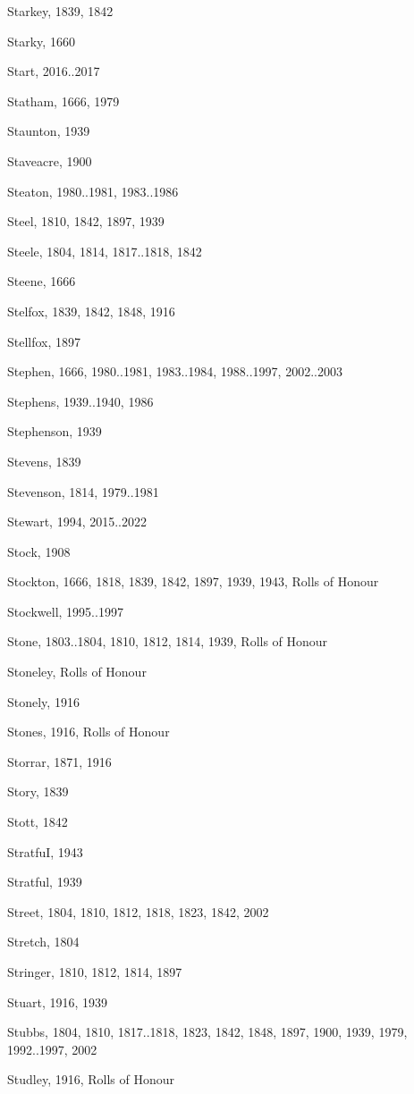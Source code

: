{\begin{theindex}
\item Starkey, 1839, 1842
\item Starky, 1660
\item Start, 2016..2017
\item Statham, 1666, 1979
\item Staunton, 1939
\item Staveacre, 1900
\item Steaton, 1980..1981, 1983..1986
\item Steel, 1810, 1842, 1897, 1939
\item Steele, 1804, 1814, 1817..1818, 1842
\item Steene, 1666
\item Stelfox, 1839, 1842, 1848, 1916
\item Stellfox, 1897
\item Stephen, 1666, 1980..1981, 1983..1984, 1988..1997, 2002..2003
\item Stephens, 1939..1940, 1986
\item Stephenson, 1939
\item Stevens, 1839
\item Stevenson, 1814, 1979..1981
\item Stewart, 1994, 2015..2022
\item Stock, 1908
\item Stockton, 1666, 1818, 1839, 1842, 1897, 1939, 1943, Rolls of Honour
\item Stockwell, 1995..1997
\item Stone, 1803..1804, 1810, 1812, 1814, 1939, Rolls of Honour
\item Stoneley, Rolls of Honour
\item Stonely, 1916
\item Stones, 1916, Rolls of Honour
\item Storrar, 1871, 1916
\item Story, 1839
\item Stott, 1842
\item StratfuI, 1943
\item Stratful, 1939
\item Street, 1804, 1810, 1812, 1818, 1823, 1842, 2002
\item Stretch, 1804
\item Stringer, 1810, 1812, 1814, 1897
\item Stuart, 1916, 1939
\item Stubbs, 1804, 1810, 1817..1818, 1823, 1842, 1848, 1897, 1900, 1939, 1979, 1992..1997, 2002
\item Studley, 1916, Rolls of Honour

\end{theindex}}
